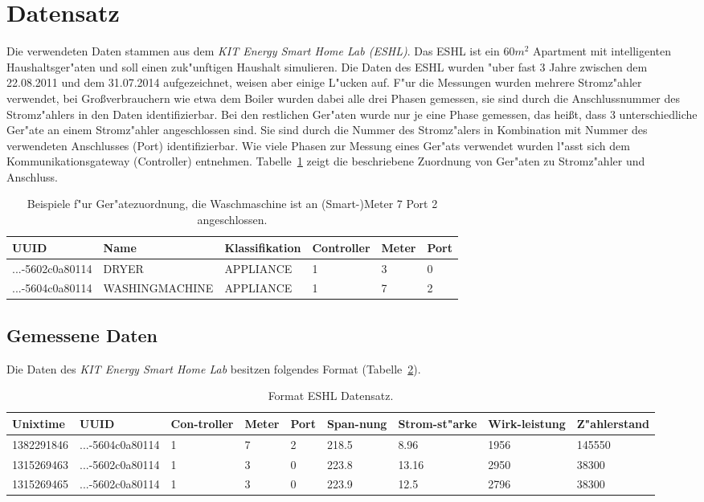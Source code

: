 \section{Datensatz}
\label{Datensatz}

Die verwendeten Daten stammen aus dem \textit{KIT Energy Smart Home Lab (ESHL)}. Das ESHL ist ein $60 m^2$ Apartment mit intelligenten Haushaltsger"aten und soll einen zuk"unftigen Haushalt simulieren. Die Daten des ESHL wurden "uber fast 3 Jahre zwischen dem 22.08.2011 und dem 31.07.2014 aufgezeichnet, weisen aber einige L"ucken auf. F"ur die Messungen wurden mehrere Stromz"ahler verwendet, bei Gro{\ss}verbrauchern wie etwa dem Boiler wurden dabei alle drei Phasen gemessen, sie sind durch die Anschlussnummer des Stromz"ahlers in den Daten identifizierbar. Bei den restlichen Ger"aten wurde nur je eine Phase gemessen, das hei{\ss}t, dass  3 unterschiedliche Ger"ate an einem Stromz"ahler angeschlossen sind. Sie sind durch die Nummer des Stromz"alers in Kombination mit Nummer des verwendeten Anschlusses (Port) identifizierbar. Wie viele Phasen zur Messung eines Ger"ats verwendet wurden l"asst sich dem Kommunikationsgateway (Controller) entnehmen.
Tabelle~\ref{uuid} zeigt die beschriebene Zuordnung von Ger"aten zu Stromz"ahler und Anschluss.
\begin{table}[h]
\begin{tabular}{l|l|l|l|l|l}
UUID & Name & Klassifikation & Controller & Meter & Port \\
\hline
...-5602c0a80114 & DRYER & APPLIANCE & 1 & 3 & 0 \\
...-5604c0a80114 & WASHINGMACHINE & APPLIANCE & 1 & 7 & 2
\end{tabular}
\caption["Ubersicht Ger"atezuordnung]{Beispiele f"ur Ger"atezuordnung, die Waschmaschine ist an (Smart-)Meter 7 Port 2 angeschlossen.}
\label{uuid}
\end{table}



\subsection{Gemessene Daten}
\label{Gemessene Daten}

Die Daten des \textit{KIT Energy Smart Home Lab} besitzen folgendes Format (Tabelle~\ref{formateshl}). \\
\begin{table}[h]
\begin{tabular}{l|l|p{1cm}|p{1cm}|p{1cm}|p{1cm}|p{1cm}|p{1.2cm}|p{2cm}}
Unixtime & UUID & Con-troller & Meter & Port & Span-nung & Strom-st"arke & Wirk-leistung & Z"ahlerstand \\
\hline
1382291846 & ...-5604c0a80114 & 1 & 7 & 2 & 218.5 & 8.96 & 1956 & 145550  \\
1315269463 & ...-5602c0a80114 & 1 & 3 & 0 & 223.8 & 13.16 & 2950 & 38300 \\
1315269465 & ...-5602c0a80114 & 1 & 3 & 0 & 223.9 & 12.5 & 2796 & 38300
\end{tabular}
\caption[Format ESHL Daten]{Format ESHL Datensatz.}
\label{formateshl}
\end{table}

